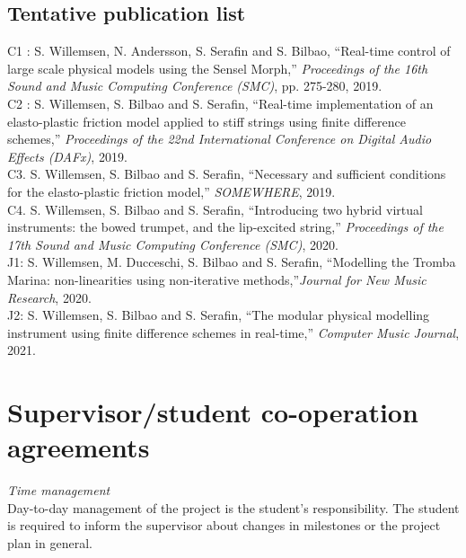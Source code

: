 \subsection{Tentative publication list}
C1 \cite{Willemsen2019a}: S. Willemsen, N. Andersson, S. Serafin and S. Bilbao, ``Real-time control of large scale physical models using the Sensel Morph,'' \textit{Proceedings of the 16th Sound and Music Computing Conference (SMC)}, pp. 275-280, 2019.
\vspace{0.15cm}
\\
C2 \cite{Willemsen2019b}: S. Willemsen, S. Bilbao and S. Serafin, ``Real-time implementation of an elasto-plastic friction model applied to stiff strings using finite difference schemes,'' \textit{Proceedings of the 22nd International Conference on Digital Audio Effects (DAFx)}, 2019.
\vspace{0.15cm}
\\
C3. S. Willemsen, S. Bilbao and S. Serafin, ``Necessary and sufficient conditions for the elasto-plastic friction model,'' \textit{SOMEWHERE}, 2019.
\vspace{0.15cm}
\\
C4. S. Willemsen, S. Bilbao and S. Serafin, ``Introducing two hybrid virtual instruments: the bowed trumpet, and the lip-excited string,'' \textit{Proceedings of the 17th Sound and Music Computing Conference (SMC)}, 2020.
\vspace{0.15cm}
\\
J1: S. Willemsen, M. Ducceschi, S. Bilbao and S. Serafin, ``Modelling the Tromba Marina: non-linearities using non-iterative methods,''\textit{Journal for New Music Research}, 2020.
\vspace{0.15cm}
\\
J2: S. Willemsen, S. Bilbao and S. Serafin, ``The modular physical modelling instrument using finite difference schemes in real-time,'' \textit{Computer Music Journal}, 2021.

\section{Supervisor/student co-operation agreements}
\textit{Time management}
\vspace{0.15cm}
\\
\noindent Day-to-day management of the project is the student’s responsibility. The student is required to inform the supervisor about changes in milestones or the project plan in general.
\\

